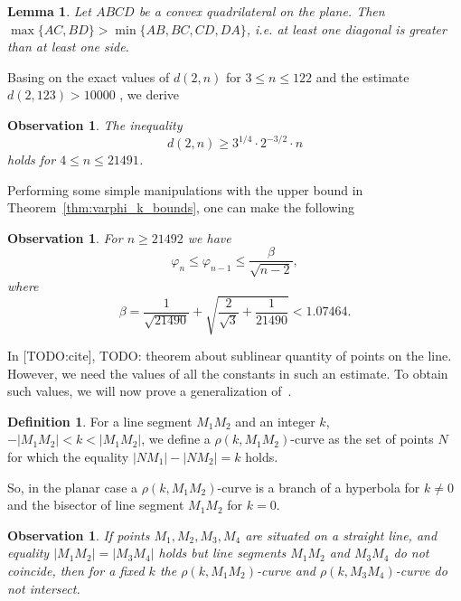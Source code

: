 \documentclass[a4paper,14pt]{article} %
\theoremstyle{plain}
\newtheorem{lemma}[theorem]{Lemma}
\newtheorem{observation}[theorem]{Observation}
\theoremstyle{definition}
\newtheorem{definition}[theorem]{Definition}
\begin{document}
\begin{lemma}
	\label{lemma:quadr_diag_edges}
	Let $ABCD$ be a convex quadrilateral on the plane.
	Then $\max\{AC,BD\}>\min\{AB,BC,CD,DA\}$,
	i.e. at least one diagonal is greater than at least one side.
\end{lemma}


Basing on the exact values of $d(2,n)$ for $ 3 \leq n\leq 122$ and the estimate $d(2,123)>10000$
\cite{kurz2008bounds}, we derive
\begin{observation}
	\label{obs:4_leq_n_leq_21491}
	The inequality
	\begin{equation}
		d(2,n) \geq 3^{1/4}\cdot2^{-3/2} \cdot n
	\end{equation}
	holds for $4 \leq n \leq 21491$.
\end{observation}

Performing some simple manipulations with the upper bound in Theorem~\ref{thm:varphi_k_bounds},
one can make the following
\begin{observation}
	\label{varphi_n_where_n_geq_21492}
	For $n \geq 21492$ we have
	\begin{equation}
		\varphi_n \leq \varphi_{n-1} \leq \frac{\beta}{\sqrt{n-2}}
		,
	\end{equation}
	where
	\begin{equation}
		\beta = \frac{1}{\sqrt{21490}} + \sqrt{ \frac{2}{\sqrt{3}} + \frac{1}{21490} } < 1.07464
		.
	\end{equation}
\end{observation}

In [TODO:cite], TODO: theorem about sublinear quantity of points on the line.
However, we need the values of all the constants in such an estimate.
To obtain such values, we will now prove a generalization of~\cite[lemma 3]{our-vmmsh-2018}.

\begin{definition}
	For a line segment $M_1 M_2$ and an integer $k$, $-|M_1 M_2| < k < |M_1 M_2|$,
	we define a $\rho(k,M_1 M_2)$-curve as the set of points $N$
	for which the equality $|N M_1| - |N M_2| = k$ holds.
\end{definition}
So, in the planar case a $\rho(k,M_1 M_2)$-curve
is a branch of a hyperbola for $k\neq 0$ and the bisector of line segment $M_1 M_2$ for $k=0$.

\begin{observation}
	\label{obs:rho_curves}
	If points $M_1,M_2,M_3,M_4$ are situated on a straight line,
	and equality $|M_1 M_2| = |M_3 M_4|$ holds but line segments $M_1 M_2$ and $M_3 M_4$ do not coincide,
	then for a fixed $k$ the $\rho(k,M_1 M_2)$-curve and $\rho(k,M_3 M_4)$-curve
	do not intersect.
\end{observation}
\end{document}
